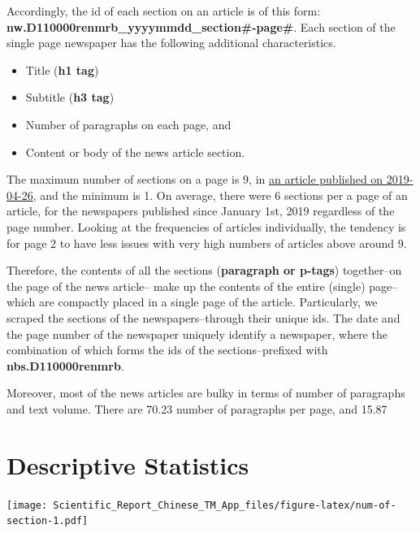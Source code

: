 \documentclass[12pt,a4paper]{article}
\let\origfigure\figure
\let\endorigfigure\endfigure
\renewenvironment{figure}[1][2] {
    \expandafter\origfigure\expandafter[H]
} {
    \endorigfigure
}
\begin{document}
Accordingly, the id of each section on an article is of this form:
\textbf{nw.D110000renmrb\_yyyymmdd\_section\#-page\#}. Each section of the single page newspaper has the following additional characteristics.

\begin{itemize}
\tightlist
\item
  Title (\textbf{h1 tag})
\item
  Subtitle (\textbf{h3 tag})
\item
  Number of paragraphs on each page, and
\item
  Content or body of the news article section.
\end{itemize}

The maximum number of sections on a page is 9, in \href{http://paper.people.com.cn/rmrb/html/2019-04/26/nbs.D110000renmrb_01.htm}{an article published on 2019-04-26}, and the minimum is 1. On average, there were 6 sections per a page of an article, for the newspapers published since January 1st, 2019 regardless of the page number. Looking at the frequencies of articles individually, the tendency is for page 2 to have less issues with very high numbers of articles above around 9.

Therefore, the contents of all the sections (\textbf{paragraph or p-tags}) together--on the page of the news article-- make up the contents of the entire (single) page--which are compactly placed in a single page of the article. Particularly, we scraped the sections of the newspapers--through their unique ids. The date and the page number of the newspaper uniquely identify a newspaper, where the combination of which forms the ids of the sections--prefixed with \textbf{nbs.D110000renmrb}.

Moreover, most of the news articles are bulky in terms of number of paragraphs and text volume. There are 70.23 number of paragraphs per page, and 15.87

\hypertarget{descriptive-statistics}{%
\section{Descriptive Statistics}\label{descriptive-statistics}}

\begin{figure}
\centering
\texttt{[image: Scientific\_Report\_Chinese\_TM\_App\_files/figure-latex/num-of-section-1.pdf]}
\caption{\label{fig:num-of-section}Distribution of \textbf{number of sections} in a page of a newspaper}
\end{figure}
\end{document}
